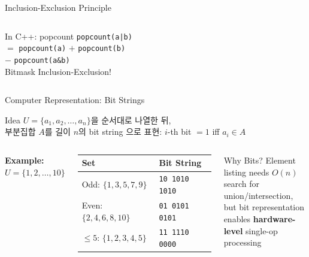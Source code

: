 \documentclass{beamer}
\begin{document}
\begin{frame}[t,shrink=6]{Inclusion-Exclusion Principle}
\begin{columns}[T]
        \vspace{0.1cm}
        \begin{alertblock}{\scriptsize In C++: popcount}
            \scriptsize \texttt{popcount(a|b)}\\
            $=$ \texttt{popcount(a)} $+$ \texttt{popcount(b)}\\
            $-$ \texttt{popcount(a\&b)}\\[2pt]
            Bitmask Inclusion-Exclusion!
        \end{alertblock}
    \end{columns}
\end{frame}

\begin{frame}[t,shrink=5]{Computer Representation: Bit Strings}
    \small
    \vspace{0.1cm}
    \begin{block}{Idea}
        \footnotesize
        $U = \{a_1, a_2, \ldots, a_n\}$을 순서대로 나열한 뒤,\\
        부분집합 $A$를 길이 $n$의 bit string 으로 표현: $i$-th bit $= 1$ iff $a_i \in A$
    \end{block}

    \vspace{0.1cm}
    \begin{columns}[T]
        \textbf{Example: $U = \{1,2,\ldots,10\}$}
        \vspace{0.05cm}

        \scriptsize
        \renewcommand{\arraystretch}{1.2}
        \begin{tabular}{ll}
            \toprule
            \textbf{Set} & \textbf{Bit String} \\
            \midrule
            Odd: $\{1,3,5,7,9\}$ & \texttt{10 1010 1010} \\
            Even: $\{2,4,6,8,10\}$ & \texttt{01 0101 0101} \\
            $\leq 5$: $\{1,2,3,4,5\}$ & \texttt{11 1110 0000} \\
            \bottomrule
        \end{tabular}
        \renewcommand{\arraystretch}{1}

        \vspace{0.1cm}
        \begin{alertblock}{\scriptsize Why Bits?}
            \scriptsize Element listing needs $O(n)$ search for\\
            union/intersection, but bit representation\\
            enables \textbf{hardware-level} single-op processing
        \end{alertblock}


\end{columns}
\end{frame}
\end{document}
